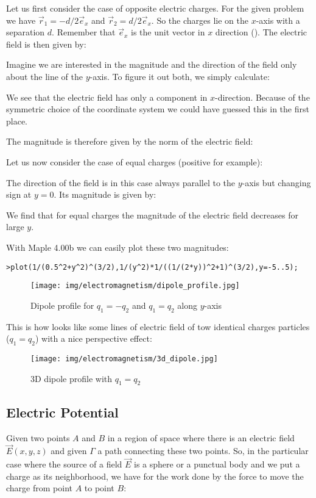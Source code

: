 	Let us first consider the case of opposite electric charges. For the given problem we have $\vec{r}_1=-d/2\vec{e}_x$ and $\vec{r}_2=d/2\vec{e}_x$. So the charges lie on the $x$-axis with a separation $d$. Remember that $\vec{e}_x$ is the unit vector in $x$ direction (). The electric field is then given by:
	
	Imagine we are interested in the magnitude and the direction of the field only about the line of the $y$-axis. To figure it out both, we simply calculate:
	
	We see that the electric field has only a component in $x$-direction. Because of the symmetric choice of the coordinate system we could have guessed this in the first place.
	
	The magnitude is therefore given by the norm of the electric field:
	
	Let us now consider the case of equal charges (positive for example):
	
	The direction of the field is in this case always parallel to the $y$-axis but changing sign at $y=0$. Its magnitude is given by:
	
	We find that for equal charges the magnitude of the electric field decreases for large $y$.
	
	With Maple 4.00b we can easily plot these two magnitudes:
	
	\texttt{>plot({1/(0.5\string^2+y\string^2)\string^(3/2),1/(y\string^2)*1/((1/(2*y))\string^2+1)\string^(3/2)},y=-5..5);}
	\begin{figure}[H]
		\centering
		\texttt{[image: img/electromagnetism/dipole\_profile.jpg]}
		\caption{Dipole profile for $q_1=-q_2$ and $q_1=q_2$ along $y$-axis}
	\end{figure}
	This is how looks like some lines of electric field of tow identical charges particles ($q_1=q_2$) with a nice perspective effect:
	\begin{figure}[H]
		\centering
		\texttt{[image: img/electromagnetism/3d\_dipole.jpg]}
		\caption{3D dipole profile with $q_1=q_2$}
	\end{figure}
	
	\pagebreak
	\subsection{Electric Potential}\label{electric potential}
	 Given two points $A$ and $B$ in a region of space where there is an electric field $\vec{E}(x,y,z)$ and given $\Gamma$ a path connecting these two points. So, in the particular case where the source of a field $\vec{E}$ is a sphere or a punctual body and we put  a charge as its neighborhood, we have for the work done by the force to move the charge from point $A$ to point $B$:
	 
